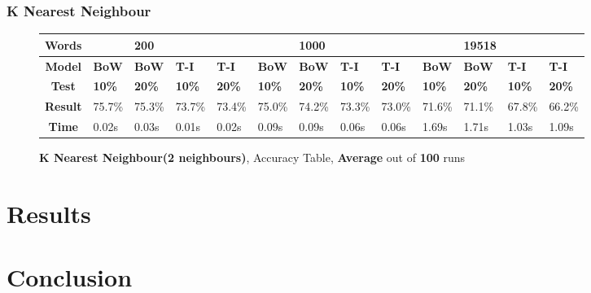 \documentclass{article}
\begin{document}
	\subsubsection{K Nearest Neighbour}
	\begin{figure}[!h]
		\begin{tabular}{||c||l|l|l|l||l|l|l|l||l|l|l|l||}
			\hline
			\textbf{Words} &  & \textbf{200} & & & &\textbf{1000} & & & & \textbf{19518} &  & \\ \hline 
			\textbf{Model} & \textbf{BoW} & \textbf{BoW} & \textbf{T-I} & \textbf{T-I} &\textbf{BoW} & \textbf{BoW} & \textbf{T-I} & \textbf{T-I} & \textbf{BoW} & \textbf{BoW} & \textbf{T-I} & \textbf{T-I}\\ \hline
			\textbf{Test} & \textbf{10\%} & \textbf{20\%} & \textbf{10\%} & \textbf{20\%} & \textbf{10\%} & \textbf{20\%} & \textbf{10\%} & \textbf{20\%} & \textbf{10\%} & \textbf{20\%} & \textbf{10\%} & \textbf{20\%} \\ \hline \hline  
			\textbf{Result} & 75.7\% & 75.3\% & 73.7\% & 73.4\% & 75.0\% & 74.2\% & 73.3\% & 73.0\% & 71.6\% & 71.1\% & 67.8\% & 66.2\% \\ \hline 
			\textbf{Time} &0.02s & 0.03s & 0.01s & 0.02s & 0.09s & 0.09s & 0.06s & 0.06s & 1.69s & 1.71s & 1.03s & 1.09s \\ \hline 
		\end{tabular}
		\caption{\textbf{K Nearest Neighbour(2 neighbours)}, Accuracy Table, \textbf{Average} out of \textbf{100} runs}
	\end{figure}

	\section{Results}
	
	\section{Conclusion}
	
	\begin{thebibliography}{9}

		
	\end{thebibliography}  
\end{document}
